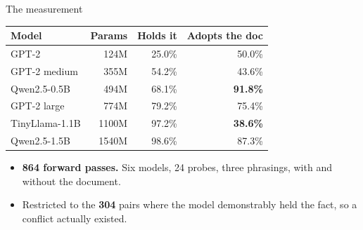 \documentclass[aspectratio=169]{beamer}
\begin{document}
\begin{frame}{The measurement}
  \begin{center}
  \begin{tabular}{@{}lrrr@{}}
    \toprule
    \textbf{Model} & \textbf{Params} & \textbf{Holds it} & \textbf{Adopts the doc} \\
    \midrule
    GPT-2            & 124M  & 25.0\% & 50.0\% \\
    GPT-2 medium     & 355M  & 54.2\% & 43.6\% \\
    Qwen2.5-0.5B     & 494M  & 68.1\% & \textcolor{ok}{\textbf{91.8\%}} \\
    GPT-2 large      & 774M  & 79.2\% & 75.4\% \\
    TinyLlama-1.1B   & 1100M & 97.2\% & \textcolor{update}{\textbf{38.6\%}} \\
    Qwen2.5-1.5B     & 1540M & 98.6\% & 87.3\% \\
    \bottomrule
  \end{tabular}
  \end{center}
  \vspace{1.0em}
  \begin{itemize}\setlength\itemsep{0.7em}
    \item \textbf{864 forward passes.} Six models, 24 probes, three phrasings,
          with and without the document.
    \item Restricted to the \textbf{304} pairs where the model demonstrably held
          the fact, so a conflict actually existed.
  \end{itemize}
\end{frame}
\end{document}
